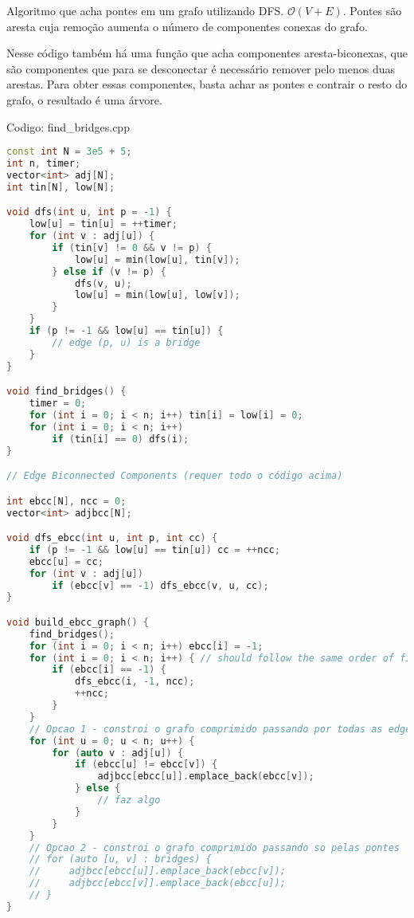 \documentclass[10pt, a4paper, oneside]{book}
\begin{document}
Algoritmo que acha pontes em um grafo utilizando DFS. $\mathcal{O}(V + E)$. Pontes são aresta cuja remoção aumenta o número de componentes conexas do grafo.



Nesse código também há uma função que acha componentes aresta-biconexas, que são componentes que para se desconectar é necessário remover pelo menos duas arestas. Para obter essas componentes, basta achar as pontes e contrair o resto do grafo, o resultado é uma árvore.
\hfill

Codigo: find\_bridges.cpp

\begin{lstlisting}[language=C++]
const int N = 3e5 + 5;
int n, timer;
vector<int> adj[N];
int tin[N], low[N];

void dfs(int u, int p = -1) {
    low[u] = tin[u] = ++timer;
    for (int v : adj[u]) {
        if (tin[v] != 0 && v != p) {
            low[u] = min(low[u], tin[v]);
        } else if (v != p) {
            dfs(v, u);
            low[u] = min(low[u], low[v]);
        }
    }
    if (p != -1 && low[u] == tin[u]) {
        // edge (p, u) is a bridge
    }
}

void find_bridges() {
    timer = 0;
    for (int i = 0; i < n; i++) tin[i] = low[i] = 0;
    for (int i = 0; i < n; i++)
        if (tin[i] == 0) dfs(i);
}

// Edge Biconnected Components (requer todo o código acima)

int ebcc[N], ncc = 0;
vector<int> adjbcc[N];

void dfs_ebcc(int u, int p, int cc) {
    if (p != -1 && low[u] == tin[u]) cc = ++ncc;
    ebcc[u] = cc;
    for (int v : adj[u])
        if (ebcc[v] == -1) dfs_ebcc(v, u, cc);
}

void build_ebcc_graph() {
    find_bridges();
    for (int i = 0; i < n; i++) ebcc[i] = -1;
    for (int i = 0; i < n; i++) { // should follow the same order of find_bridges dfs
        if (ebcc[i] == -1) {
            dfs_ebcc(i, -1, ncc);
            ++ncc;
        }
    }
    // Opcao 1 - constroi o grafo comprimido passando por todas as edges
    for (int u = 0; u < n; u++) {
        for (auto v : adj[u]) {
            if (ebcc[u] != ebcc[v]) {
                adjbcc[ebcc[u]].emplace_back(ebcc[v]);
            } else {
                // faz algo
            }
        }
    }
    // Opcao 2 - constroi o grafo comprimido passando so pelas pontes
    // for (auto [u, v] : bridges) {
    //     adjbcc[ebcc[u]].emplace_back(ebcc[v]);
    //     adjbcc[ebcc[v]].emplace_back(ebcc[u]);
    // }
}\end{lstlisting}
\hfill
\end{document}
